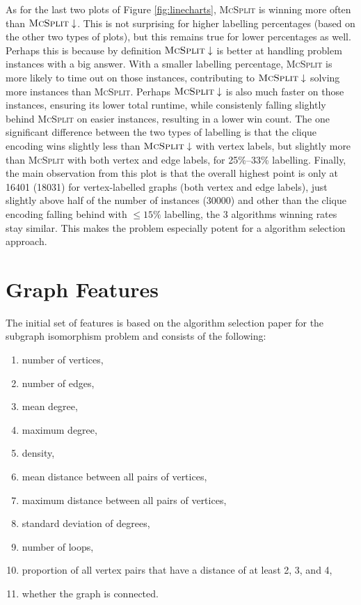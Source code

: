 \documentclass{l4proj}
\theoremstyle{definition}
\theoremstyle{remark}
\begin{document}
As for the last two plots of Figure \ref{fig:linecharts}, \textsc{McSplit} is
winning more often than $\textsc{McSplit}\downarrow$. This is not surprising for
higher labelling percentages (based on the other two types of plots), but this
remains true for lower percentages as well. Perhaps this is because by
definition $\textsc{McSplit}\downarrow$ is better at handling problem instances
with a big answer. With a smaller labelling percentage, \textsc{McSplit} is more
likely to time out on those instances, contributing to
$\textsc{McSplit}\downarrow$ solving more instances than \textsc{McSplit}.
Perhaps $\textsc{McSplit}\downarrow$ is also much faster on those instances,
ensuring its lower total runtime, while consistenly falling slightly behind
\textsc{McSplit} on easier instances, resulting in a lower win count. The one
significant difference between the two types of labelling is that the clique
encoding wins slightly less than $\textsc{McSplit}\downarrow$ with vertex
labels, but slightly more than \textsc{McSplit} with both vertex and edge
labels, for 25\%--33\% labelling. Finally, the main observation from this plot
is that the overall highest point is only at \num{16401} (\num{18031}) for
vertex-labelled graphs (both vertex and edge labels), just slightly above half
of the number of instances (\num{30000}) and other than the clique encoding
falling behind with $\le 15\%$ labelling, the 3 algorithms winning rates stay
similar. This makes the problem especially potent for a algorithm selection
approach.

\section{Graph Features} \label{sec:features}
The initial set of features is based on the algorithm selection paper for the
subgraph isomorphism problem \cite{DBLP:conf/lion/KotthoffMS16} and consists of
the following:

\begin{enumerate}
\item number of vertices,
\item number of edges,
\item mean degree,
\item maximum degree,
\item density,
\item mean distance between all pairs of vertices,
\item maximum distance between all pairs of vertices,
\item standard deviation of degrees,
\item number of loops,
\item proportion of all vertex pairs that have a distance of at least 2, 3, and 4,
\item whether the graph is connected.
\end{enumerate}
\end{document}
